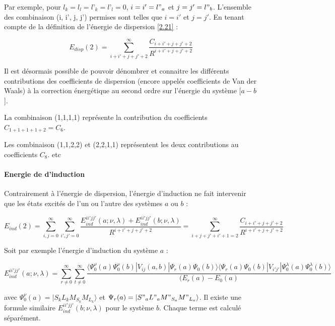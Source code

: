 Par exemple, pour $l_{k} = l_{l} = l’_{k} = l’_{l} = 0$, $i = i' = l"_{a}$ et $j = j' = l"_{b}$. L'ensemble des combinaison (i, i', j, j') permises sont telles que $i = i'$ et $j = j'$. En tenant compte de la définition de l'énergie de dispersion \ref{2.21} : 
	
\begin{equation}
E_{disp}(2) = \sum_{i+i'+j+j'+2}^{\infty} \frac{C_{i+i'+j+j'+2}}{R^{i+i'+j+j'+2}}
\end{equation}
	
Il est désormais possible de pouvoir dénombrer et connaitre les différents contributions des coefficients de dispersion (encore appelés coefficients de Van der Waals) à la correction énergétique au second ordre sur l'énergie du système [$a - b$].

La combinaison (1,1,1,1) représente la contribution du coefficients $C_{1+1+1+1+2} = C_{6}$.
	
Les combinaison (1,1,2,2) et (2,2,1,1) représentent les deux contributions au coefficients $C_{8}$. etc
	

\paragraph{Energie de d’induction}

Contrairement à l'énergie de dispersion, l'énergie d'induction ne fait intervenir que les états excités de l'un ou l'autre des systèmes $a$ ou $b$ : 
	
\begin{equation}
E_{ind}(2) = \sum_{i,j=0}^{\infty} \sum_{i',j'=0}^{\infty} \frac{E_{ind}^{ii'jj'} (a; \nu , \lambda) + E_{ind}^{ii'jj'} (b; \nu , \lambda)}{R^{i+i'+j+j'+2}} = \sum_{i+j+j'+i'+1=2}^{\infty} \frac{C_{i+i'+j+j'+2}}{R^{i+i'+j+j'+2}}
\end{equation}
		
Soit par exemple l'énergie d'induction du système $a$ :
	
\begin{equation}
E_{ind}^{ii'jj'} (a;\nu , \lambda) = \sum_{r \neq 0}^{\infty} \sum_{t\neq 0}^{\infty} \frac{\langle \Psi_{0}^{\nu} (a) \Psi_{0}^{\nu} (b) |V_{ij} (a,b)|\Psi_{r} (a) \Psi_{0} (b) \rangle  \langle \Psi_{r} (a)\Psi_{0} (b) |V_{i'j'}|\Psi_{0}^{\lambda} (a) \Psi_{0}^{\lambda}(b) \rangle}{(E_{r} (a) - E_{0}(a)}
\end{equation}
	
avec $\Psi_{0}^{\nu} (a) = |S_{k} L_{k} M_{S_{k}} M_{L_{k}}\rangle$ et $\Psi_{r}(a) = |S"_{a} L"_{a} M"_{S_{a}} M"_{L_{a}}\rangle$. Il existe une formule similaire $E_{ind}^{ii'jj'} (b;\nu , \lambda)$ pour le système $b$. Chaque terme est calculé séparément.\\

